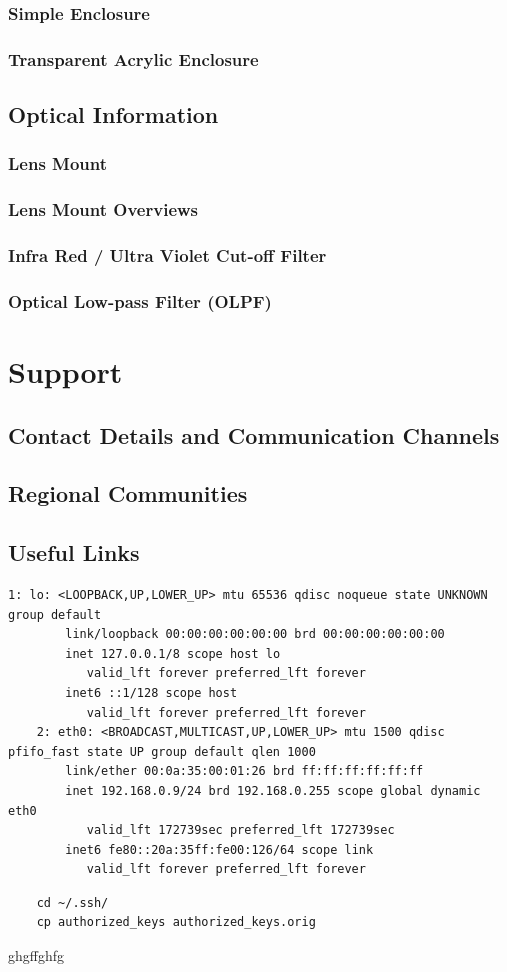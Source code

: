 \documentclass{article}
\begin{document}
\subsubsection{Simple Enclosure}
\subsubsection{Transparent Acrylic Enclosure}
\subsection{Optical Information}
\subsubsection{Lens Mount}
\subsubsection{Lens Mount Overviews}
\subsubsection{Infra Red / Ultra Violet Cut-off Filter}
\subsubsection{Optical Low-pass Filter (OLPF)}

\section{Support}
\subsection{Contact Details and Communication Channels}
\subsection{Regional Communities}
\subsection{Useful Links}





\begin{lstlisting}[breaklines=true, breakatwhitespace=true]
    1: lo: <LOOPBACK,UP,LOWER_UP> mtu 65536 qdisc noqueue state UNKNOWN group default 
        link/loopback 00:00:00:00:00:00 brd 00:00:00:00:00:00
        inet 127.0.0.1/8 scope host lo
           valid_lft forever preferred_lft forever
        inet6 ::1/128 scope host 
           valid_lft forever preferred_lft forever
    2: eth0: <BROADCAST,MULTICAST,UP,LOWER_UP> mtu 1500 qdisc pfifo_fast state UP group default qlen 1000
        link/ether 00:0a:35:00:01:26 brd ff:ff:ff:ff:ff:ff
        inet 192.168.0.9/24 brd 192.168.0.255 scope global dynamic eth0
           valid_lft 172739sec preferred_lft 172739sec
        inet6 fe80::20a:35ff:fe00:126/64 scope link 
           valid_lft forever preferred_lft forever
\end{lstlisting}


\begin{lstlisting}
    cd ~/.ssh/
    cp authorized_keys authorized_keys.orig
\end{lstlisting}


ghgffghfg
\end{document}
